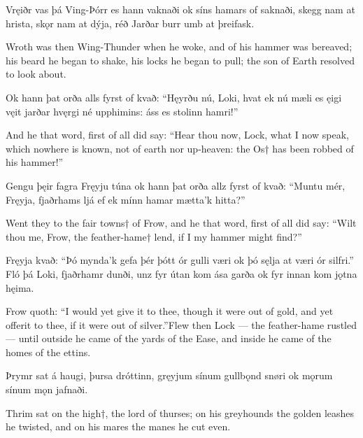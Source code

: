 Vręiðr vas þá Ving-Þórr \hld es hann vaknaði
ok síns hamars \hld of saknaði,
skegg nam at hrista, \hld skǫr nam at dýja,
réð Jarðar burr \hld umb at þreifask.

Wroth was then Wing-Thunder when he woke, and of his hammer was bereaved; his beard he began to shake, his locks he began to pull; the son of Earth resolved to look about.

Ok hann þat orða \hld alls fyrst of kvað:
“Hęyrðu nú, Loki, \hld hvat ek nú mæli
es ęigi vęit \hld jarðar hvęrgi
né upphimins: \hld áss es stolinn hamri!”

And he that word, first of all did say: “Hear thou now, Lock, what I now speak, which nowhere is known, not of earth nor up-heaven: the Os† has been robbed of his hammer!”

Gengu þęir fagra \hld Fręyju túna
ok hann þat orða \hld allz fyrst of kvað:
“Muntu mér, Fręyja, \hld fjaðrhams ljá
ef ek mínn hamar \hld mætta’k hitta?”

Went they to the fair towns† of Frow, and he that word, first of all did say: “Wilt thou me, Frow, the feather-hame† lend, if I my hammer might find?”

Fręyja kvað:
“Þó mynda’k gefa þér \hld þótt ór gulli væri
ok þó sęlja \hld at væri ór silfri.”
Fló þá Loki, \hld fjaðrhamr dunði,
unz fyr útan kom \hld ása garða
ok fyr innan kom \hld jǫtna hęima. 

Frow quoth:
“I would yet give it to thee, though it were out of gold, and yet offer\footnotemark[1] it to thee, if it were out of silver.”\footnotemark[2] Flew then Lock — the feather-hame rustled — until outside he came of the yards of the Ease, and inside he came of the homes of the ettins.\footnotemark[3]

Þrymr sat á haugi, \hld þursa dróttinn,
gręyjum sínum \hld gullbǫnd snøri
ok mǫrum sínum \hld mǫn jafnaði. 

Thrim sat on the high†, the lord of thurses; on his greyhounds the golden leashes he twisted, and on his mares the manes he cut even.

